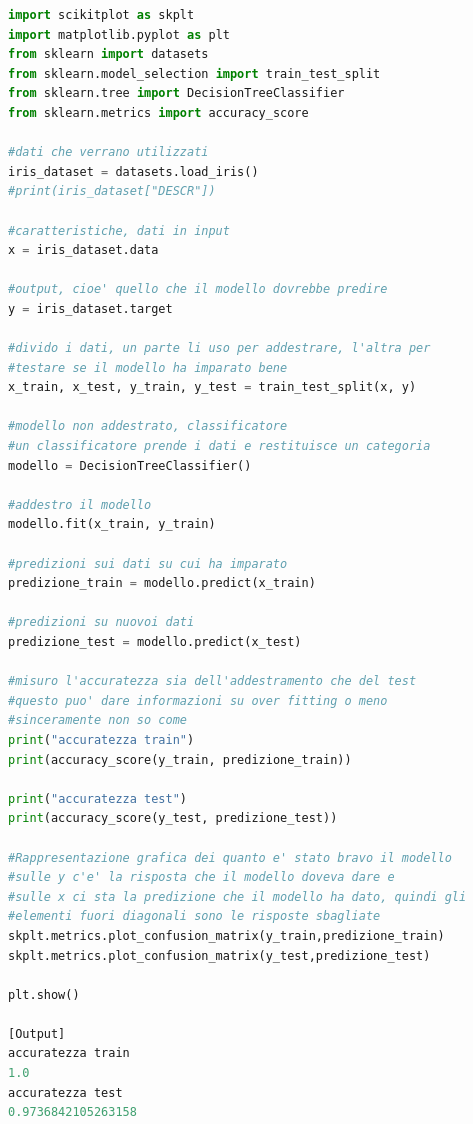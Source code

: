 \documentclass[10pt,a4paper]{article}
\begin{document}
\begin{lstlisting}[language=Python]
import scikitplot as skplt
import matplotlib.pyplot as plt
from sklearn import datasets
from sklearn.model_selection import train_test_split
from sklearn.tree import DecisionTreeClassifier
from sklearn.metrics import accuracy_score

#dati che verrano utilizzati
iris_dataset = datasets.load_iris()
#print(iris_dataset["DESCR"])

#caratteristiche, dati in input
x = iris_dataset.data

#output, cioe' quello che il modello dovrebbe predire
y = iris_dataset.target

#divido i dati, un parte li uso per addestrare, l'altra per
#testare se il modello ha imparato bene
x_train, x_test, y_train, y_test = train_test_split(x, y)

#modello non addestrato, classificatore
#un classificatore prende i dati e restituisce un categoria
modello = DecisionTreeClassifier()

#addestro il modello
modello.fit(x_train, y_train)

#predizioni sui dati su cui ha imparato
predizione_train = modello.predict(x_train)

#predizioni su nuovoi dati
predizione_test = modello.predict(x_test)

#misuro l'accuratezza sia dell'addestramento che del test
#questo puo' dare informazioni su over fitting o meno
#sinceramente non so come
print("accuratezza train")
print(accuracy_score(y_train, predizione_train))

print("accuratezza test")
print(accuracy_score(y_test, predizione_test))

#Rappresentazione grafica dei quanto e' stato bravo il modello
#sulle y c'e' la risposta che il modello doveva dare e
#sulle x ci sta la predizione che il modello ha dato, quindi gli
#elementi fuori diagonali sono le risposte sbagliate
skplt.metrics.plot_confusion_matrix(y_train,predizione_train)
skplt.metrics.plot_confusion_matrix(y_test,predizione_test)

plt.show()

[Output]
accuratezza train
1.0
accuratezza test
0.9736842105263158

\end{lstlisting}
\end{document}
